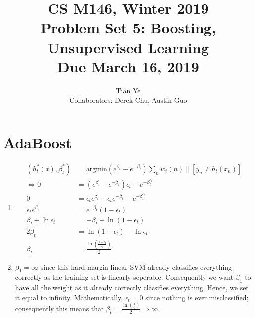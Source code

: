\documentclass[11pt]{article}
\newcommand{\cnum}{CS M146}
\newcommand{\ced}{Winter 2019}
\newcommand{\ctitle}[3]{\title{\vspace{-0.5in}\cnum, \ced\\Problem Set #1: #2\\Due #3}}
\newcommand{\solution}[1]{{{\color{blue}{\bf Solution:} {#1}}}}
\begin{document}
\ctitle{5}{Boosting, Unsupervised Learning}{March 16, 2019}
\author{Tian Ye \\ \small{Collaborators: Derek Chu, Austin Guo}}
\maketitle

\newpage

\section{AdaBoost}
\begin{enumerate}
\item 
\solution{
\begin{align}
(h^*_t(x), \beta^*_t) &= \text{argmin}(e^{\beta_t}-e^{-\beta_t})\sum_n w_t(n)\lVert[y_n \neq h_t(x_n)] \\
\Rightarrow 0 &= (e^{\beta_t}-e^{-\beta_t})\epsilon_t - e^{-\beta_t^{\epsilon_t}} \\
0 &= \epsilon_te^{\beta_t}+\epsilon_te^{-\beta_t}-e^{-\beta_t^{\epsilon_t}} \\
\epsilon_te^{\beta_t} &= e^{-\beta_t}(1-\epsilon_t) \\
\beta_t + \ln \epsilon_t &= -\beta_t + \ln (1-\epsilon_t) \\
2\beta_t &= \ln(1-\epsilon_t)-\ln\epsilon_t \\
\beta_t &= \frac{\ln(\frac{1-\epsilon_t}{\epsilon_t})}{2}
\end{align}
}
\vspace{1cm}

\item
\solution{
$\beta_1 = \infty$ since this hard-margin linear SVM already classifies everything correctly as the training set is linearly seperable. Consequently we want $\beta_1$ to have all the weight as it already correctly classifies everything. Hence, we set it equal to infinity. Mathematically, $\epsilon_t = 0$ since nothing is ever misclassified; consequently this means that $\beta_t = \frac{\ln(\frac{1}{0})}{2} \Rightarrow \infty$.
}
\end{enumerate}
\newpage
\end{document}
